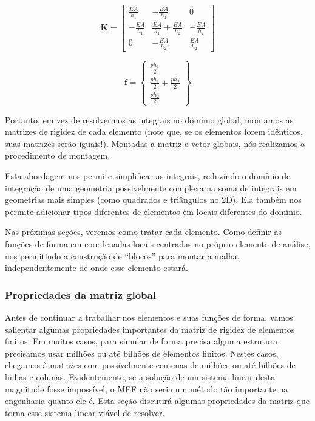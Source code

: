        \begin{equation*}
            \mathbf{K} = 
            \begin{bmatrix}
                \frac{EA}{h_1} & -\frac{EA}{h_1} & 0\\
                -\frac{EA}{h_1} & \frac{EA}{h_1} + \frac{EA}{h_2} & -\frac{EA}{h_2}\\
                0 & -\frac{EA}{h_2} & \frac{EA}{h_2}
            \end{bmatrix}
        \end{equation*}

        \begin{equation*}
            \mathbf{f} = 
            \begin{Bmatrix}
                \frac{p h_1}{2}\\
                \frac{p h_1}{2} + \frac{p h_2}{2}\\
                \frac{p h_2}{2}
            \end{Bmatrix}
        \end{equation*}

        Portanto, em vez de resolvermos as integrais no domínio global, montamos as matrizes de rigidez de cada elemento (note que, se os elementos forem idênticos, suas matrizes serão iguais!). Montadas a matriz e vetor globais, nós realizamos o procedimento de montagem.

        Esta abordagem nos permite simplificar as integrais, reduzindo o domínio de integração de uma geometria possivelmente complexa na soma de integrais em geometrias mais simples (como quadrados e triângulos no 2D). Ela também nos permite adicionar tipos diferentes de elementos em locais diferentes do domínio.

        Nas próximas seções, veremos como tratar cada elemento. Como definir as funções de forma em coordenadas locais centradas no próprio elemento de análise, nos permitindo a construção de ``blocos'' para montar a malha, independentemente de onde esse elemento estará.

        \subsubsection*{Propriedades da matriz global}

        Antes de continuar a trabalhar nos elementos e suas funções de forma, vamos salientar algumas propriedades importantes da matriz de rigidez de elementos finitos. Em muitos casos, para simular de forma precisa alguma estrutura, precisamos usar milhões ou até bilhões de elementos finitos. Nestes casos, chegamos à matrizes com possivelmente centenas de milhões ou até bilhões de linhas e colunas. Evidentemente, se a solução de um sistema linear desta magnitude fosse impossível, o MEF não seria um método tão importante na engenharia quanto ele é. Esta seção discutirá algumas propriedades da matriz que torna esse sistema linear viável de resolver.

